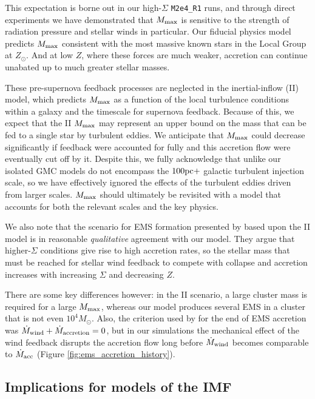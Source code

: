 \documentclass[apjl,twocolumn]{openjournal}
\begin{document}
This expectation is borne out in our high-$\Sigma$ \texttt{M2e4\_R1} runs, and through direct experiments we have demonstrated that $M_{\rm max}$ is sensitive to the strength of radiation pressure and stellar winds in particular. Our fiducial physics model predicts $M_{\rm max}$ consistent with the most massive known stars in the Local Group at $Z_\odot$. And at low $Z$, where these forces are much weaker, accretion can continue unabated up to much greater stellar masses.

These pre-supernova feedback processes are neglected in the \citet{padoan_2019_massive_sf} inertial-inflow (II) model, which predicts $M_{\rm max}$ as a function of the local turbulence conditions within a galaxy and the timescale for supernova feedback. Because of this, we expect that the II $M_{\rm max}$ may represent an upper bound on the mass that can be fed to a single star by turbulent eddies. We anticipate that $M_{\rm max}$ could decrease significantly if feedback were accounted for fully and this accretion flow were eventually cut off by it. Despite this, we fully acknowledge that unlike \citet{padoan_2019_massive_sf} our isolated GMC models do not encompass the $100 \rm pc+$ galactic turbulent injection scale, so we have effectively ignored the effects of the turbulent eddies driven from larger scales. $M_{\rm max}$ should ultimately be revisited with a model that accounts for both the relevant scales and the key physics.

We also note that the scenario for EMS formation presented by \citet{gieles:2025.inertial.inflow.ems} based upon the II model is in reasonable {\it qualitative} agreement with our model. They argue that higher-$\Sigma$ conditions give rise to high accretion rates, so the stellar mass that must be reached for stellar wind feedback to compete with collapse and accretion increases with increasing $\Sigma$ and decreasing $Z$. 

There are some key differences however: in the II scenario, a large cluster mass is required for a large $M_{\rm max}$, whereas our model produces several EMS in a cluster that is not even $10^4 M_\odot$. Also, the criterion used by \citet{gieles:2025.inertial.inflow.ems} for the end of EMS accretion was $\dot{M}_{\rm wind}+\dot{M}_{\rm accretion} = 0$, but in our simulations the mechanical effect of the wind feedback disrupts the accretion flow long before $\dot{M}_{\rm wind}$ becomes comparable to $\dot{M}_{\rm acc}$ (Figure \ref{fig:ems_accretion_history}).

\subsection{Implications for models of the IMF}
\end{document}
